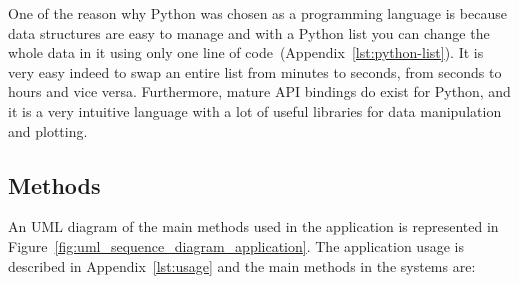 \documentclass[USenglish]{uit-thesis}
\begin{document}
One of the reason why Python was chosen as a programming language is because
data structures are easy to manage and with a Python list you can change the whole
data in it using only one line of code~(Appendix~\ref{lst:python-list}). It is very easy indeed to swap an entire
list from minutes to seconds, from seconds to hours and vice versa. Furthermore,
mature API bindings do exist for Python, and it is a very intuitive language with a lot
of useful libraries for data manipulation and plotting.

\subsection{Methods}
An UML diagram of the main methods used in the application is represented in
Figure~\ref{fig:uml_sequence_diagram_application}.
The application usage is described in Appendix~\ref{lst:usage} and the main
methods in the systems are:
\end{document}
